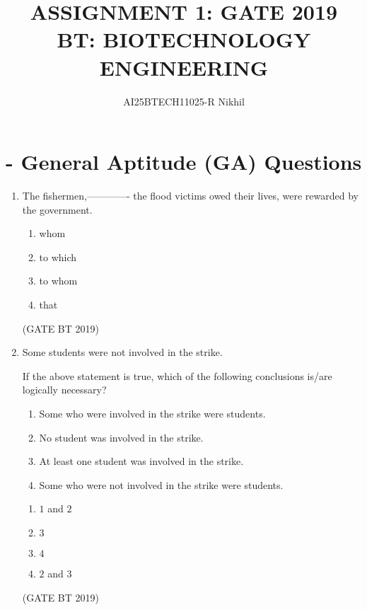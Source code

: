 \documentclass[journal,12pt,onecolumn]{IEEEtran}
\begin{document}
\title{
ASSIGNMENT 1: GATE 2019 \\
BT: BIOTECHNOLOGY ENGINEERING}
\author{AI25BTECH11025-R Nikhil}
\maketitle
\renewcommand{\thefigure}{\theenumi}
\renewcommand{\thetable}{\theenumi}


\section*{ - General Aptitude (GA) Questions}

\begin{enumerate}

    \item The fishermen,------------- the flood victims owed their lives, were rewarded by the government.
    \begin{multicols}{4}
    \begin{enumerate}
        \item whom  
        \item to which  
        \item to whom  
        \item that  
    \end{enumerate}
    \end{multicols}\hfill(GATE BT 2019)

    \item Some students were not involved in the strike.

    If the above statement is true, which of the following conclusions is/are logically necessary?
    \begin{enumerate}
        \item Some who were involved in the strike were students.  
        \item No student was involved in the strike.  
        \item At least one student was involved in the strike.  
        \item Some who were not involved in the strike were students.  
    \end{enumerate}
    \begin{multicols}{4}
    \begin{enumerate}
        \item $1$ and $2$  
        \item $3$  
        \item $4$  
        \item $2$ and $3$  
    \end{enumerate}
    \end{multicols}\hfill(GATE BT 2019)


\end{enumerate}
\end{document}
